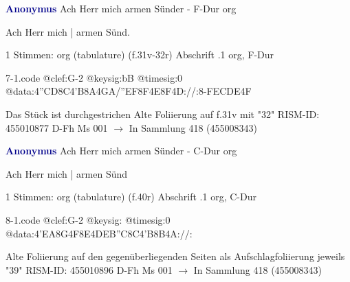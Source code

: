 \documentclass[twocolumn]{book}
\begin{document}
\newline \par \vspace{7pt} \textcolor{darkblue}{\textbf{Anonymus  }}
\newline Ach Herr mich armen Sünder - F-Dur
\newline org
\newline \begin{itshape}[f.31v, at left:] Ach Herr mich | armen Sünd.\end{itshape} 
\newline \textcolor{darkblue}{}  1 Stimmen: org (tabulature)  (f.31v-32r)
\newline Abschrift
.1  org, F-Dur  
\begin{filecontents*}{7-1.code}
@clef:G-2
@keysig:bB
@timesig:0
@data:4''CD8C4'B8A4GA/''EF8F4E8F4D://:8-FEC{DE}4F
\end{filecontents*}
\newline
%
\newline Das Stück ist durchgestrichen
\newline Alte Foliierung auf f.31v mit "32"
\newline RISM-ID: 455010877
\newline D-Fh  Ms 001
\newline $\rightarrow$ In Sammlung 418 (455008343)
      
\newline \par \vspace{7pt} \textcolor{darkblue}{\textbf{Anonymus  }}
\newline Ach Herr mich armen Sünder - C-Dur
\newline org
\newline \begin{itshape}[f.40r, at left:] Ach Herr mich | armen Sünd\end{itshape} 
\newline \textcolor{darkblue}{}  1 Stimmen: org (tabulature)  (f.40r)
\newline Abschrift
.1  org, C-Dur  
\begin{filecontents*}{8-1.code}
@clef:G-2
@keysig:
@timesig:0
@data:4'EA8G4F8E4DEB''C8C4'B8B4A://:
\end{filecontents*}
\newline
%
\newline Alte Foliierung auf den gegenüberliegenden Seiten als Aufschlagfoliierung jeweils "39"
\newline RISM-ID: 455010896
\newline D-Fh  Ms 001
\newline $\rightarrow$ In Sammlung 418 (455008343)
      
\end{document}
